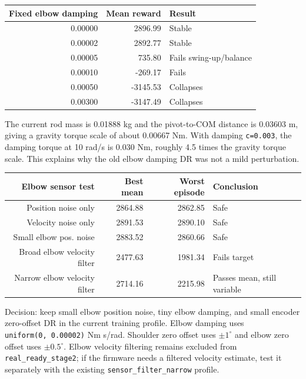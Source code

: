 \documentclass[12pt,a4paper]{article}
\begin{document}
\begin{center}
\begin{tabular}{rrl}
\toprule
\textbf{Fixed elbow damping} & \textbf{Mean reward} & \textbf{Result} \\
\midrule
0.00000 & 2896.99 & Stable \\
0.00002 & 2892.77 & Stable \\
0.00005 & 735.80  & Fails swing-up/balance \\
0.00010 & -269.17 & Fails \\
0.00050 & -3145.53 & Collapses \\
0.00300 & -3147.49 & Collapses \\
\bottomrule
\end{tabular}
\end{center}

\noindent The current rod mass is 0.01888 kg and the pivot-to-COM distance is
0.03603 m, giving a gravity torque scale of about 0.00667 Nm.  With damping
\texttt{c=0.003}, the damping torque at 10 rad/s is 0.030 Nm, roughly 4.5
times the gravity torque scale.  This explains why the old elbow damping DR
was not a mild perturbation.

\begin{center}
\begin{tabular}{rrrl}
\toprule
\textbf{Elbow sensor test} & \textbf{Best mean} & \textbf{Worst episode} & \textbf{Conclusion} \\
\midrule
Position noise only & 2864.88 & 2862.85 & Safe \\
Velocity noise only & 2891.53 & 2890.10 & Safe \\
Small elbow pos. noise & 2883.52 & 2860.66 & Safe \\
Broad elbow velocity filter & 2477.63 & 1981.34 & Fails target \\
Narrow elbow velocity filter & 2714.16 & 2215.98 & Passes mean, still variable \\
\bottomrule
\end{tabular}
\end{center}

\noindent Decision: keep small elbow position noise, tiny elbow damping, and
small encoder zero-offset DR in the current training profile.  Elbow damping
uses \texttt{uniform(0,\ 0.00002)} Nm s/rad.  Shoulder zero offset uses
$\pm1^\circ$ and elbow zero offset uses $\pm0.5^\circ$.  Elbow velocity
filtering remains excluded from \texttt{real\_ready\_stage2}; if the firmware
needs a filtered velocity estimate, test it separately with the existing
\texttt{sensor\_filter\_narrow} profile.
\end{document}
